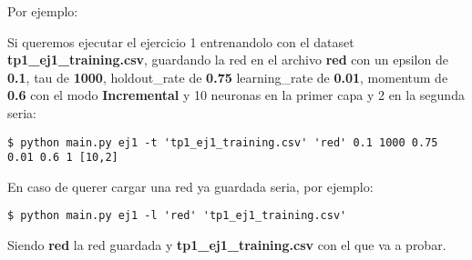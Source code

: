 Por ejemplo: 

Si queremos ejecutar el ejercicio 1 entrenandolo con el dataset \textbf{tp1\_ej1\_training.csv}, guardando la red en el archivo 
\textbf{red} con un epsilon de \textbf{0.1}, tau de \textbf{1000}, holdout\_rate de \textbf{0.75} learning\_rate de \textbf{0.01}, momentum de \textbf{0.6} con el modo \textbf{Incremental} y 10 neuronas en la primer capa y 2 en la segunda seria:

\begin{verbatim}
$ python main.py ej1 -t 'tp1_ej1_training.csv' 'red' 0.1 1000 0.75  0.01 0.6 1 [10,2] 
\end{verbatim}

En caso de querer cargar una red ya guardada seria, por ejemplo:

\begin{verbatim}
$ python main.py ej1 -l 'red' 'tp1_ej1_training.csv'
\end{verbatim}

Siendo \textbf{red} la red guardada y \textbf{tp1\_ej1\_training.csv} con el que va a probar.